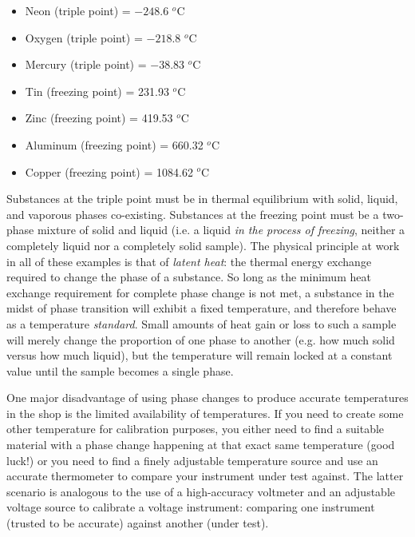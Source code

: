 \begin{itemize}
\item Neon (triple point) = $-248.6$ $^{o}$C
\item Oxygen (triple point) = $-218.8$ $^{o}$C
\item Mercury (triple point) = $-38.83$ $^{o}$C
\item Tin (freezing point) = 231.93 $^{o}$C
\item Zinc (freezing point) = 419.53 $^{o}$C
\item Aluminum (freezing point) = 660.32 $^{o}$C
\item Copper (freezing point) = 1084.62 $^{o}$C
\end{itemize}

Substances at the triple point must be in thermal equilibrium with solid, liquid, and vaporous phases co-existing.  Substances at the freezing point must be a two-phase mixture of solid and liquid (i.e. a liquid \textit{in the process of freezing}, neither a completely liquid nor a completely solid sample).  The physical principle at work in all of these examples is that of \textit{latent heat}: the thermal energy exchange required to change the phase of a substance.  So long as the minimum heat exchange requirement for complete phase change is not met, a substance in the midst of phase transition will exhibit a fixed temperature, and therefore behave as a temperature \textit{standard}.  Small amounts of heat gain or loss to such a sample will merely change the proportion of one phase to another (e.g. how much solid versus how much liquid), but the temperature will remain locked at a constant value until the sample becomes a single phase.

\vskip 10pt

One major disadvantage of using phase changes to produce accurate temperatures in the shop is the limited availability of temperatures.  If you need to create some other temperature for calibration purposes, you either need to find a suitable material with a phase change happening at that exact same temperature (good luck!) or you need to find a finely adjustable temperature source and use an accurate thermometer to compare your instrument under test against.  The latter scenario is analogous to the use of a high-accuracy voltmeter and an adjustable voltage source to calibrate a voltage instrument: comparing one instrument (trusted to be accurate) against another (under test).

